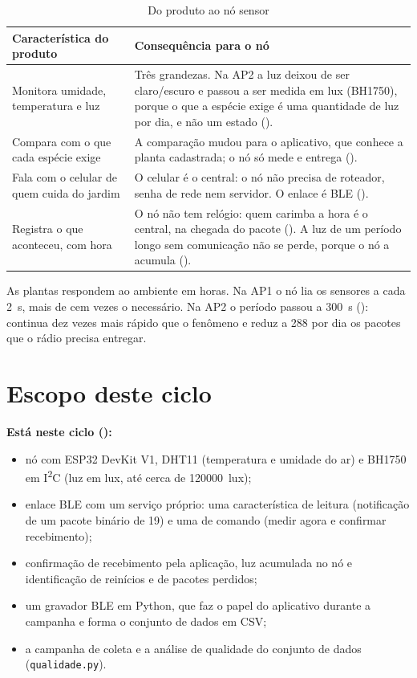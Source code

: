 \begin{table}[H]
\centering
\caption{Do produto ao nó sensor}
\label{tab:produto-no}
\footnotesize
\begin{tabular}{@{}L{4.6cm}L{9.4cm}@{}}
\toprule
\textbf{Característica do produto} & \textbf{Consequência para o nó} \\
\midrule
Monitora umidade, temperatura e luz &
  Três grandezas. Na AP2 a luz deixou de ser claro/escuro e passou a ser
  medida em lux (BH1750), porque o que a espécie exige é uma quantidade
  de luz por dia, e não um estado (). \\
Compara com o que cada espécie exige &
  A comparação mudou para o aplicativo, que conhece a planta
  cadastrada; o nó só mede e entrega (). \\
Fala com o celular de quem cuida do jardim &
  O celular é o central: o nó não precisa de roteador, senha de rede nem
  servidor. O enlace é BLE (). \\
Registra o que aconteceu, com hora &
  O nó não tem relógio: quem carimba a hora é o central, na chegada do
  pacote (). A luz de um período longo sem comunicação não se
  perde, porque o nó a acumula (). \\
\bottomrule
\end{tabular}
\end{table}

As plantas respondem ao ambiente em horas. Na AP1 o nó lia os sensores a
cada \SI{2}{\second}, mais de cem vezes o necessário. Na AP2 o período
passou a \SI{300}{\second} (): continua dez vezes mais rápido que
o fenômeno e reduz a 288 por dia os pacotes que o rádio precisa entregar.

\section{Escopo deste ciclo}

\noindent\textbf{Está neste ciclo (\moduloDoCiclo):}
\begin{itemize}
  \item nó com ESP32 DevKit V1, DHT11 (temperatura e umidade do ar) e
    BH1750 em I\textsuperscript{2}C (luz em lux, até cerca de
    \SI{120000}{lux});
  \item enlace BLE com um serviço próprio: uma característica de leitura
    (notificação de um pacote binário de \SI{19}{\byte}) e uma de
    comando (medir agora e confirmar recebimento);
  \item confirmação de recebimento pela aplicação, luz acumulada no nó e
    identificação de reinícios e de pacotes perdidos;
  \item um gravador BLE em Python, que faz o papel do aplicativo durante
    a campanha e forma o conjunto de dados em CSV;
  \item a campanha de coleta e a análise de qualidade do conjunto de
    dados (\texttt{qualidade.py}).
\end{itemize}

